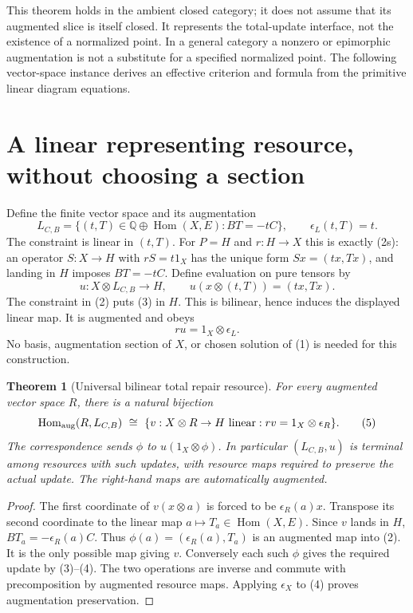 \documentclass[11pt]{article}
\newtheorem{theorem}{Theorem}\newtheorem{proposition}{Proposition}\newtheorem{lemma}{Lemma}
\newcommand{\Hom}{\operatorname{Hom}}\newcommand{\im}{\operatorname{im}}
\begin{document}
This theorem holds in the ambient closed category; it does not assume that its augmented slice is itself closed. It represents the total-update interface, not the existence of a normalized point. In a general category a nonzero or epimorphic augmentation is not a substitute for a specified normalized point. The following vector-space instance derives an effective criterion and formula from the primitive linear diagram equations.

\section{A linear representing resource, without choosing a section}
Define the finite vector space and its augmentation
\[
 L_{C,B}=\{(t,T)\in\mathbb Q\oplus\Hom(X,E):BT=-tC\},
 \qquad \epsilon_L(t,T)=t.\tag{2}
\]
The constraint is linear in $(t,T)$. For $P=H$ and $r:H\to X$ this is exactly (2s): an operator $S:X\to H$ with $rS=t1_X$ has the unique form $Sx=(tx,Tx)$, and landing in $H$ imposes $BT=-tC$. Define evaluation on pure tensors by
\[
 u:X\otimes L_{C,B}\to H,
 \qquad u(x\otimes(t,T))=(tx,Tx).\tag{3}
\]
The constraint in (2) puts (3) in $H$. This is bilinear, hence induces the displayed linear map. It is augmented and obeys
\[
 ru=1_X\otimes\epsilon_L.\tag{4}
\]
No basis, augmentation section of $X$, or chosen solution of (1) is needed for this construction.

\begin{theorem}[Universal bilinear total repair resource]
For every augmented vector space $R$, there is a natural bijection
\[
 \Hom_{\rm aug}(R,L_{C,B})\ \cong\
 \{v:X\otimes R\to H\text{ linear}:rv=1_X\otimes\epsilon_R\}.
 \tag{5}
\]
The correspondence sends $\phi$ to $u(1_X\otimes\phi)$. In particular $(L_{C,B},u)$ is terminal among resources with such updates, with resource maps required to preserve the actual update. The right-hand maps are automatically augmented.
\end{theorem}
\begin{proof}
The first coordinate of $v(x\otimes a)$ is forced to be $\epsilon_R(a)x$. Transpose its second coordinate to the linear map $a\mapsto T_a\in\Hom(X,E)$. Since $v$ lands in $H$, $BT_a=-\epsilon_R(a)C$. Thus $\phi(a)=(\epsilon_R(a),T_a)$ is an augmented map into (2). It is the only possible map giving $v$. Conversely each such $\phi$ gives the required update by (3)--(4). The two operations are inverse and commute with precomposition by augmented resource maps. Applying $\epsilon_X$ to (4) proves augmentation preservation.
\end{proof}
\end{document}
